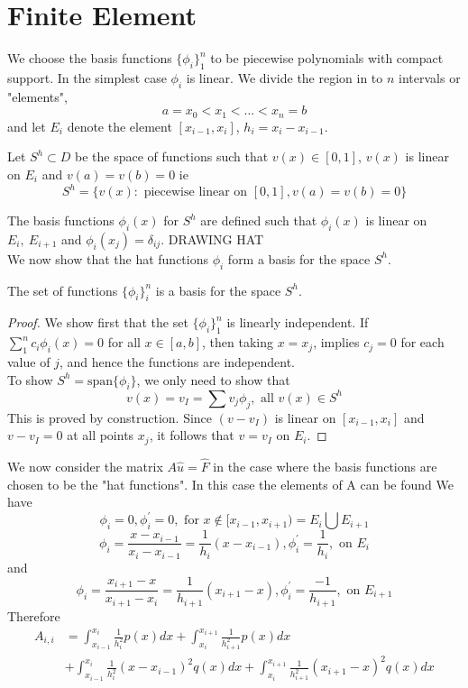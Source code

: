\section{Finite Element}
We choose the basis functions $\{\phi_i \}_1^n$ to be piecewise polynomials with
compact support.  In the simplest case $\phi_i$ is linear. We divide
 the region in to $n$ intervals or "elements",
\[a=x_0 < x_1 < ... <x_n=b  \]
and let $E_i$ denote the element $[x_{i-1},x_i]$, $h_i=x_i-x_{i-1}$.\\

\begin{definition}
Let $S^h \subset D$ be the space of functions such that $v(x) \in [0,1]$, $v(x)$
is linear on $E_i$ and $v(a)=v(b)=0$ ie
\[S^h = \{v(x): \mbox{ piecewise linear on } [0,1], v(a)=v(b)=0\} \]
\end{definition}
The basis functions $\phi_i(x)$ for $S^h$ are defined such that $\phi_i(x)$ is linear on $E_i, \ E_{i+1}$ and $\phi_i(x_j)=\delta_{ij}$.
DRAWING HAT\\
We now show that the hat functions $\phi_i$ form a basis for the space $S^h$.
\begin{lemma}
The set of functions $\{\phi_i \}_i^n$ is a basis for the space $S^h$.
\end{lemma}
\begin{proof}
We show first that the set $\{\phi_i \}_{1}^n$ is linearly independent.
If
$\sum_{1}^n c_i \phi_i(x) =0$ for all $x \in [a,b]$, then taking $x=x_j$, implies
$c_j=0$ for each value of $j$, and hence the functions are independent.\\
To show $S^h=\mbox{span}\{\phi_i \}$, we only need to show that
\[v(x)=v_{I}=\sum v_j\phi_j, \mbox{ all } v(x) \in S^h \]
This is proved by construction. Since $(v-v_{I})$ is linear on $[
x_{i-1},x_i]$ and $v-v_{I}=0$ at all points $x_j$, it follows that $v=v_I$ on $E_i$.
\end{proof}
We now consider the matrix $A\hat{u}=\hat{F}$ in the case where the basis functions
are chosen to be the "hat functions". In this case the elements of A can be found
We have
\[\phi_i=0, \phi_i^{'}=0, \mbox{ for }  x\notin [x_{i-1},x_{i+1}) = E_{i}\bigcup E_{i+1}\]
\[\phi_i=\frac{x-x_{i-1}}{x_i-x_{i-1}}=\frac{1}{h_i}(x-x_{i-1}), \phi_i^{'}=\frac{1}{h_{i}}, \mbox{ on }  E_{i}\]
and
\[\phi_i=\frac{x_{i+1}-x}{x_{i+1}-x_{i}}=\frac{1}{h_{i+1}}(x_{i+1}-x), \phi_i^{'}=\frac{-1}{h_{i+1}}, \mbox{ on }  E_{i+1}\]
Therefore
\[\begin{array}{ll}
A_{i,i}&=\int_{x_{i-1}}^{x_{i}}\frac{1}{h_i^2}p(x)dx +\int_{x_{i}}^{x_{i+1}}\frac{1}{h_{i+1}^2}p(x)dx \\
&+\int_{x_{i-1}}^{x_{i}}\frac{1}{h_i^2}(x-x_{i-1})^2q(x)dx +\int_{x_{i}}^{x_{i+1}}\frac{1}{h_{i+1}^2}(x_{i+1}-x)^2q(x)dx 
\end{array}
 \]
